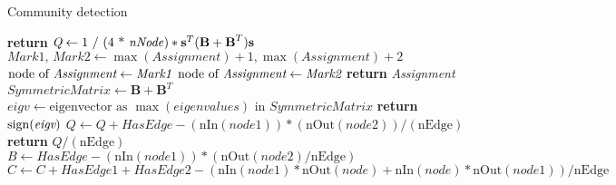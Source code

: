 \begin{algorithm}[H]
	\caption{Community detection}\label{alg:communitydetection}
	\begin{algorithmic}[1]
		\State \textbf{return} \emph{$\textit{Q} \gets \text{1 / (4 * \textit{nNode})} * \textbf{s}^T(\textbf{B}+\textbf{B}^T)\textbf{s}$}
		\EndProcedure
		\State $\textit{Mark1, Mark2} \gets \max( \textit{Assignment})+1, \max( \textit{Assignment})+2$
		 {$\text{node of } \textit{Assignment} \gets \emph{Mark1}$}
		\EndIf
		 {$\text{node of } \textit{Assignment} \gets \emph{Mark2}$}
		\EndIf
		\EndFor
		\State \textbf{return} \emph{Assignment}
		\EndProcedure
		\State $\textit{SymmetricMatrix} \gets  \textbf{B}+\textbf{B}^T$
		\State $\textit{eigv} \gets \text{eigenvector as }\max(eigenvalues) \text{ in } \textit{SymmetricMatrix}$
		\State \textbf{return} $\operatorname{sign}(\textit{eigv})$
		\EndProcedure
		\State $Q \gets Q + HasEdge - (\text{nIn}( \textit{node1}))*(\text{nOut}(\textit{node2}))/ (\text{nEdge})$
		\EndIf
		\EndFor
		\EndFor
		\State \textbf{return} \emph{$Q / (\text{nEdge})$}
		\EndProcedure
		\State $\textit{B} \gets \textit{HasEdge} - (\text{nIn}( \textit{node1}))*(\text{nOut}( \textit{node2})/\text{nEdge})$
		 {$C \gets C+\textit{HasEdge1}+\textit{HasEdge2}-(\text{nIn} (\textit{node1})*\text{nOut}(\textit{node})+\text{nIn}( \textit{node})*\text{nOut}(\textit{node1}))/\text{nEdge}$}
		\EndFor
		\EndIf
		\EndFor
		\EndFor
		\EndProcedure

\end{algorithmic}
\end{algorithm}
